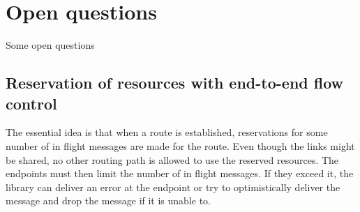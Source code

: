 \documentclass[a4paper,twoside]{report} %
\begin{document}







\section{Open questions}
Some open questions

\subsection{Reservation of resources with end-to-end flow control}
The essential idea is that when a route is established,
reservations for some number of in flight messages are made for the route.
Even though the links might be shared,
no other routing path is allowed to use the reserved resources.
The endpoints must then limit the number of in flight messages.
If they exceed it, the library can deliver an error at the endpoint or try to
optimistically deliver the message and drop the message if it is unable to.
\end{document}
